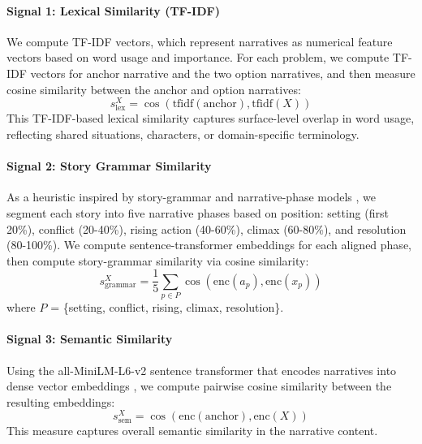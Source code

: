 \documentclass[11pt]{article}
\begin{document}
\paragraph{Signal 1: Lexical Similarity (TF-IDF)}
We compute TF-IDF \cite{salton1988term} vectors, which represent narratives as numerical feature vectors based on word usage and importance. For each problem, we compute TF-IDF vectors for anchor narrative and the two option narratives, and then measure cosine similarity between the anchor and option narratives:
\begin{equation}
s_{\text{lex}}^X = \cos(\text{tfidf}(\text{anchor}), \text{tfidf}(X))
\end{equation}
This TF-IDF-based lexical similarity captures surface-level overlap in word usage, reflecting shared situations, characters, or domain-specific terminology.

\paragraph{Signal 2: Story Grammar Similarity}
As a heuristic inspired by story-grammar and narrative-phase models \citep{propp1968morphology,freytag1894technik,thorndyke1977storygrammar}, we segment each story into five narrative phases based on position: setting (first 20\%), conflict (20-40\%), rising action (40-60\%), climax (60-80\%), and resolution (80-100\%). We compute sentence-transformer embeddings for each aligned phase, then compute story-grammar similarity via cosine similarity:
\begin{equation}
s_{\text{grammar}}^X = \frac{1}{5}\sum_{p \in P} \cos(\text{enc}(a_p), \text{enc}(x_p))
\end{equation}
where $P$ = \{setting, conflict, rising, climax, resolution\}.

\paragraph{Signal 3: Semantic Similarity}
Using the all-MiniLM-L6-v2 sentence transformer that encodes narratives into dense vector embeddings \citep{reimers2019sentence,reimers2020allminilm}, we compute pairwise cosine similarity between the resulting embeddings:
\begin{equation}
s_{\text{sem}}^X = \cos(\text{enc}(\text{anchor}), \text{enc}(X))
\end{equation}
This measure captures overall semantic similarity in the narrative content.
\end{document}
